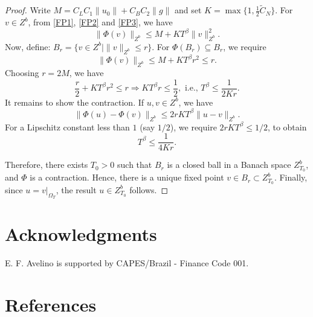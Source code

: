 \documentclass[11pt]{article}
\numberwithin{equation}{section}
\begin{document}
\begin{proof}
Write $M = C_{L} C_{1} \|u_{0}\| + C_{B} C_{2} \|g\|$ and set $K = \max\{1, \frac{1}{2}\tilde{C}_{N}\}$. For $v \in Z^{b}$, from \eqref{FP1}, \eqref{FP2} and \eqref{FP3}, we have
\begin{equation}
\|\Phi(v)\|_{Z^{b}} \le M + K T^{\beta} \|v\|_{Z^{b}}^{2}.
\end{equation}
Now, define: $B_{r} = \{ v \in Z^{b} \mid \|v\|_{Z^{b}} \le r \}$. For $\Phi(B_{r}) \subseteq B_{r}$, we require
\begin{equation}
\|\Phi(v)\|_{Z^{b}} \le M + K T^{\beta} r^{2} \le r.
\end{equation}
Choosing $r = 2M$, we have
\begin{equation}
\frac{r}{2} + K T^{\beta} r^{2} \le r \Rightarrow K T^{\beta} r \le \frac{1}{2}, \text{ i.e., } T^{\beta} \le \frac{1}{2Kr}.
\end{equation}
It remains to show the contraction. If $u, v \in Z^{b}$, we have
\begin{equation}
\|\Phi(u) - \Phi(v)\|_{Z^{b}} \le 2rK T^{\beta} \|u - v\|_{Z^{b}}.
\end{equation}
For a Lipschitz constant less than $1$ (say $1/2$), we require $2r K T^{\beta} \le 1/2$, to obtain
\begin{equation}
T^{\beta} \le \frac{1}{4Kr}.
\end{equation}

Therefore, there exists $T_0>0$ such that $B_r$ is a closed ball in
a Banach space $Z^{b}_{T_0}$, and $\Phi$ is a contraction. Hence,
there is a unique fixed point $v \in B_{r} \subset Z^{b}_{T_0}$.
Finally, since $u = v|_{\Omega_{T}}$, the result $u \in Z^{b}_{T_0}$
follows.
\end{proof}

\section*{Acknowledgments}
E. F. Avelino is supported by CAPES/Brazil - Finance Code 001.

\section*{References }
\end{document}
